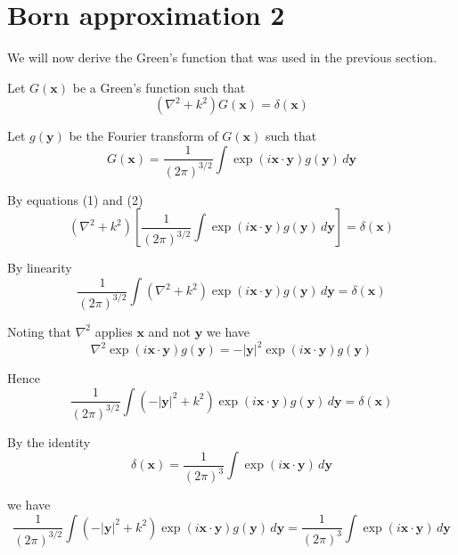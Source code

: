 


\section*{Born approximation 2}

We will now derive the Green's function that was used in the previous section.

\bigskip
Let $G(\mathbf x)$ be a Green's function such that
\begin{equation*}
\left(\nabla^2+k^2\right)G(\mathbf x)=\delta(\mathbf x)
\tag{1}
\end{equation*}

Let $g(\mathbf y)$ be the Fourier transform of $G(\mathbf x)$ such that
\begin{equation*}
G(\mathbf x)
=\frac{1}{(2\pi)^{3/2}}
\int\exp(i\mathbf x\cdot\mathbf y)
g(\mathbf y)\,d\mathbf y
\tag{2}
\end{equation*}

By equations (1) and (2)
\begin{equation*}
\left(\nabla^2+k^2\right)
\left[\frac{1}{(2\pi)^{3/2}}\int\exp(i\mathbf x\cdot\mathbf y)g(\mathbf y)\,d\mathbf y\right]
=\delta(\mathbf x)
\end{equation*}

By linearity
\begin{equation*}
\frac{1}{(2\pi)^{3/2}}
\int\left(\nabla^2+k^2\right)\exp(i\mathbf x\cdot\mathbf y)g(\mathbf y)\,d\mathbf y
=\delta(\mathbf x)
\end{equation*}

Noting that $\nabla^2$ applies $\mathbf x$ and not $\mathbf y$ we have
\begin{equation*}
\nabla^2\exp(i\mathbf x\cdot\mathbf y)g(\mathbf y)
=-|\mathbf y|^2\exp(i\mathbf x\cdot\mathbf y)g(\mathbf y)
\end{equation*}

Hence
\begin{equation*}
\frac{1}{(2\pi)^{3/2}}
\int\left(-|\mathbf y|^2+k^2\right)\exp(i\mathbf x\cdot\mathbf y)g(\mathbf y)\,d\mathbf y
=\delta(\mathbf x)
\end{equation*}

By the identity
\begin{equation*}
\delta(\mathbf x)=\frac{1}{(2\pi)^3}\int\exp(i\mathbf x\cdot\mathbf y)\,d\mathbf y
\end{equation*}

we have
\begin{equation*}
\frac{1}{(2\pi)^{3/2}}
\int\left(-|\mathbf y|^2+k^2\right)\exp(i\mathbf x\cdot\mathbf y)g(\mathbf y)\,d\mathbf y
=\frac{1}{(2\pi)^3}\int\exp(i\mathbf x\cdot\mathbf y)\,d\mathbf y
\end{equation*}

